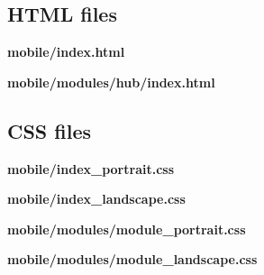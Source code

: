 \subsection{HTML files}

\noindent \textbf{mobile/index.html}


\noindent \textbf{mobile/modules/hub/index.html}


\subsection{CSS files}

\noindent \textbf{mobile/index\_portrait.css}


\noindent \textbf{mobile/index\_landscape.css}


\noindent \textbf{mobile/modules/module\_portrait.css}


\noindent \textbf{mobile/modules/module\_landscape.css}
